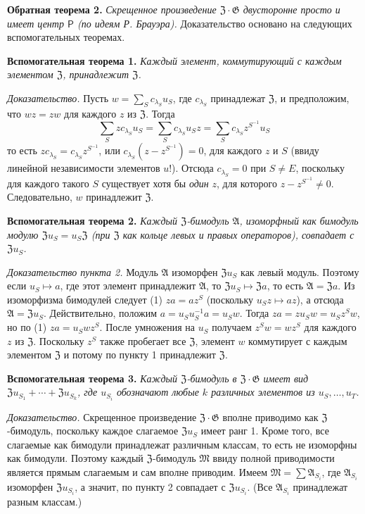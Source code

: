 \documentclass[11pt]{article}
\begin{document}
\noindent\textbf{Обратная теорема 2.} \emph{Скрещенное произведение \(\mathfrak Z\cdot\mathfrak G\) двусторонне просто и имеет центр \(\mathsf{P}\) (по идеям Р. Брауэра).} Доказательство основано на следующих вспомогательных теоремах.

\noindent\textbf{Вспомогательная теорема 1.} \emph{Каждый элемент, коммутирующий с каждым элементом \(\mathfrak Z\), принадлежит \(\mathfrak Z\).}

\noindent\emph{Доказательство.} Пусть \(w=\sum_S c_{\lambda_S}u_S\), где \(c_{\lambda_S}\) принадлежат \(\mathfrak Z\), и предположим, что \(wz=zw\) для каждого \(z\) из \(\mathfrak Z\). Тогда
\[
\sum_S zc_{\lambda_S}u_S
 =\sum_S c_{\lambda_S}u_Sz
 =\sum_S c_{\lambda_S}z^{S^{-1}}u_S
\]
то есть \(zc_{\lambda_S}=c_{\lambda_S}z^{S^{-1}}\), или \(c_{\lambda_S}(z-z^{S^{-1}})=0\), для каждого \(z\) и \(S\) (ввиду линейной независимости элементов \(u\)!). Отсюда \(c_{\lambda_S}=0\) при \(S\neq E\), поскольку для каждого такого \(S\) существует хотя бы \emph{один} \(z\), для которого \(z-z^{S^{-1}}\neq0\). Следовательно, \(w\) принадлежит \(\mathfrak Z\).

\noindent\textbf{Вспомогательная теорема 2.} \emph{Каждый \(\mathfrak Z\)-бимодуль \(\mathfrak A\), изоморфный как бимодуль модулю \(\mathfrak Zu_S=u_S\mathfrak Z\) (при \(\mathfrak Z\) как кольце левых и правых операторов), совпадает с \(\mathfrak Zu_S\).}

\noindent\emph{Доказательство пункта 2.} Модуль \(\mathfrak A\) изоморфен \(\mathfrak Zu_S\) как левый модуль. Поэтому если \(u_S\mapsto a\), где этот элемент принадлежит \(\mathfrak A\), то \(\mathfrak Zu_S\mapsto\mathfrak Za\), то есть \(\mathfrak A=\mathfrak Za\). Из изоморфизма бимодулей следует (1) \(za=az^S\) (поскольку \(u_Sz\mapsto az\)), а отсюда \(\mathfrak A=\mathfrak Zu_S\). Действительно, положим \(a=u_Su_S^{-1}a=u_Sw\). Тогда \(za=zu_Sw=u_Sz^Sw\), но по (1) \(za=u_Swz^S\). После умножения на \(u_S\) получаем \(z^Sw=wz^S\) для каждого \(z\) из \(\mathfrak Z\). Поскольку \(z^S\) также пробегает все \(\mathfrak Z\), элемент \(w\) коммутирует с каждым элементом \(\mathfrak Z\) и потому по пункту 1 принадлежит \(\mathfrak Z\).

\noindent\textbf{Вспомогательная теорема 3.} \emph{Каждый \(\mathfrak Z\)-бимодуль в \(\mathfrak Z\cdot\mathfrak G\) имеет вид \(\mathfrak Zu_{S_1}+\cdots+\mathfrak Zu_{S_k}\), где \(u_{S_i}\) обозначают любые \(k\) различных элементов из \(u_S,\ldots,u_T\).}

\noindent\emph{Доказательство.} Скрещенное произведение \(\mathfrak Z\cdot\mathfrak G\) вполне приводимо как \(\mathfrak Z\)-бимодуль, поскольку каждое слагаемое \(\mathfrak Zu_S\) имеет ранг 1. Кроме того, все слагаемые как бимодули принадлежат различным классам, то есть не изоморфны как бимодули. Поэтому каждый \(\mathfrak Z\)-бимодуль \(\mathfrak M\) ввиду полной приводимости является прямым слагаемым и сам вполне приводим. Имеем \(\mathfrak M=\sum\mathfrak A_{S_i}\), где \(\mathfrak A_{S_i}\) изоморфен \(\mathfrak Zu_{S_i}\), а значит, по пункту 2 совпадает с \(\mathfrak Zu_{S_i}\). (Все \(\mathfrak A_{S_i}\) принадлежат разным классам.)
\end{document}
